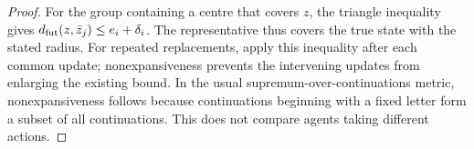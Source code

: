 \begin{proof}
For the group containing a centre that covers $z$, the triangle inequality
gives $d_{\rm fut}(z,\bar z_j)\le e_i+\delta_i$. The representative thus
covers the true state with the stated radius. For repeated replacements,
apply this inequality after each common update; nonexpansiveness prevents
the intervening updates from enlarging the existing bound. In the usual
supremum-over-continuations metric, nonexpansiveness follows because
continuations beginning with a fixed letter form a subset of all
continuations. This does not compare agents taking different actions.
\end{proof}
